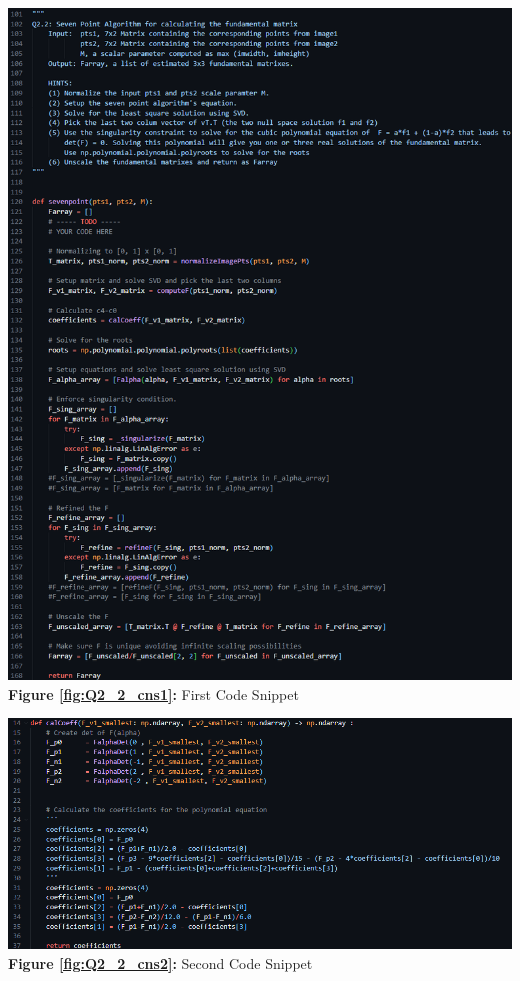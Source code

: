 \begin{your_solution}[title=Q2.2,height=23cm,width=\linewidth]
\begin{minipage}{0.48\linewidth}
	\centering
	\includegraphics[width=\linewidth]{../Q2_2_cns1.png}
	\textbf{Figure \ref{fig:Q2_2_cns1}:} First Code Snippet  %
	\label{fig:Q2_2_cns1}         %
\end{minipage}
\hfill
\begin{minipage}{0.48\linewidth}
	\centering
	\includegraphics[width=\linewidth]{../Q2_2_cns2.png}
	\textbf{Figure \ref{fig:Q2_2_cns2}:} Second Code Snippet  %
	\label{fig:Q2_2_cns2}         %
\end{minipage}	
\newline
\end{your_solution}
